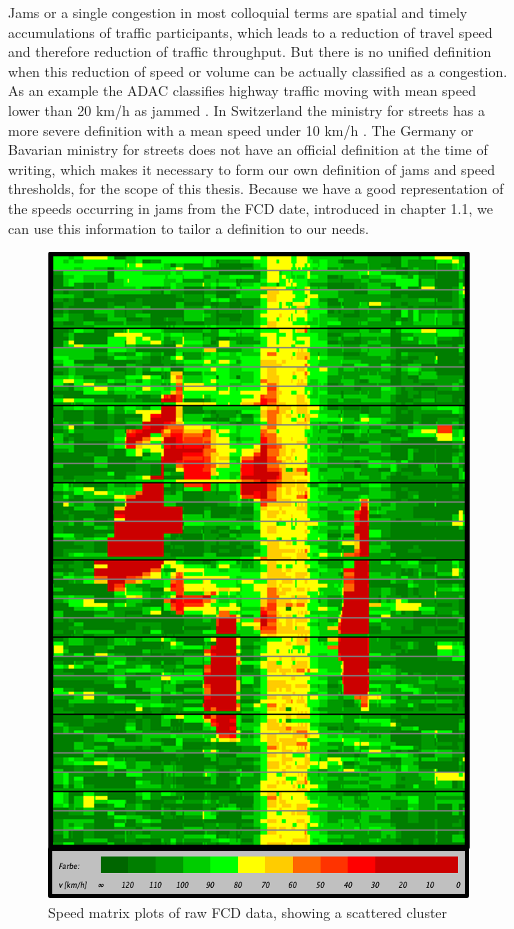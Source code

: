 \documentclass[a4paper,12pt]{report}
\begin{document}
\bigskip

Jams or a single congestion in most colloquial terms are spatial and timely accumulations of traffic participants, which leads to a reduction of travel speed and therefore reduction of traffic throughput. But there is no unified definition when this reduction of speed or volume can be actually classified as a congestion. As an example the ADAC classifies highway traffic moving with mean speed lower than 20 km/h as jammed \cite{ADAC2019}. In Switzerland the ministry for streets has a more severe definition with a mean speed under 10 km/h \cite{ASTRA2020}. The Germany or Bavarian ministry for streets does not have an official definition at the time of writing, which makes it necessary to form our own definition of jams and speed thresholds, for the scope of this thesis. Because we have a good representation of the speeds occurring in jams from the FCD date, introduced in chapter 1.1, we can use this information to tailor a definition to our needs. 

\begin{figure}[h]
	\centering
	\includegraphics[scale=0.8]{./assets/SpeedMatrixPlot_single}
	\caption{Speed matrix plots of raw FCD data, showing a scattered cluster}
	\label{img:speedMatrixPlot_singleCluster}
\end{figure}
\end{document}
